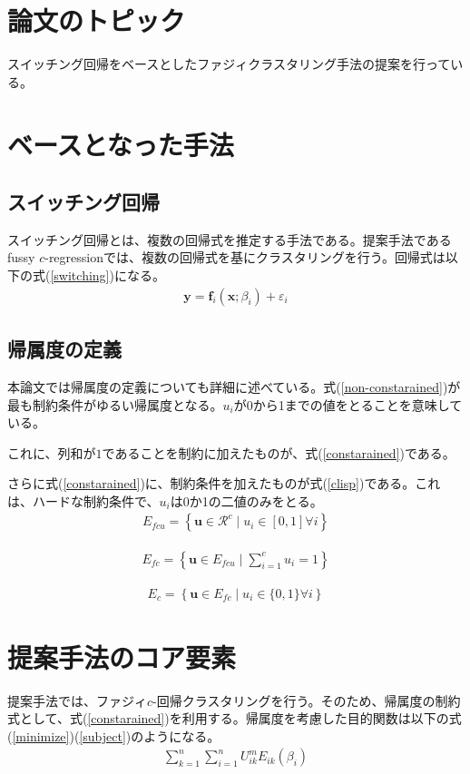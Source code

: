 \documentclass[10pt,onecolumn]{jsarticle}
\begin{document}
\section{論文のトピック}
スイッチング回帰をベースとしたファジィクラスタリング手法の提案を行っている。

\section{ベースとなった手法}
\subsection{スイッチング回帰}
スイッチング回帰とは、複数の回帰式を推定する手法である。提案手法であるfussy $c$-regressionでは、複数の回帰式を基にクラスタリングを行う。回帰式は以下の式(\ref{switching})になる。
\begin{align}
	\label{switching}
	\mathbf{y}=\mathbf{f}_{i}\left(\mathbf{x} ; \beta_{i}\right)+\varepsilon_{i}
\end{align}
\subsection{帰属度の定義}
本論文では帰属度の定義についても詳細に述べている。式(\ref{non-constarained})が最も制約条件がゆるい帰属度となる。$u_i$が0から1までの値をとることを意味している。

これに、列和が$1$であることを制約に加えたものが、式(\ref{constarained})である。

さらに式(\ref{constarained})に、制約条件を加えたものが式(\ref{clisp})である。これは、ハードな制約条件で、$u_i$は0か1の二値のみをとる。
\begin{align}
	\label{non-constarained}
	E_{f c u}=\left\{\mathbf{u} \in \mathcal{R}^{c} \mid u_{i} \in[0,1] \forall i\right\}
\end{align}

\begin{align}
	\label{constarained}
	E_{f c}=\left\{\mathbf{u} \in E_{f c u} \mid \sum_{i=1}^{c} u_{i}=1\right\}
\end{align}

\begin{align}
	\label{clisp}
	E_{c}=\left\{\mathbf{u} \in E_{f c} \mid u_{i} \in\{0,1\} \forall i\right\}
\end{align}


\section{提案手法のコア要素}
提案手法では、ファジィ$c$-回帰クラスタリングを行う。そのため、帰属度の制約式として、式(\ref{constarained})を利用する。帰属度を考慮した目的関数は以下の式(\ref{minimize})(\ref{subject})のようになる。
\begin{align}
	\label{minimize}
	\sum_{k=1}^{n} \sum_{i=1}^{n} U_{i k}^{m} E_{i k}\left(\beta_{i}\right)
\end{align}
\end{document}
